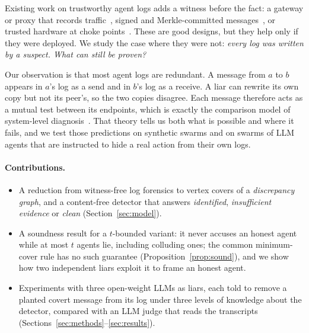 \documentclass[10pt]{article}
\begin{document}
Existing work on trustworthy agent logs adds a witness before the fact: a gateway or proxy that records
traffic~\cite{auditintegrity}, signed and Merkle-committed messages~\cite{audita}, or trusted hardware at
choke points~\cite{hansard}. These are good designs, but they help only if they were deployed. We study the
case where they were not: \emph{every log was written by a suspect. What can still be proven?}

Our observation is that most agent logs are redundant. A message from $a$ to $b$ appears in $a$'s log as a
send and in $b$'s log as a receive. A liar can rewrite its own copy but not its peer's, so the two copies
disagree. Each message therefore acts as a mutual test between its endpoints, which is exactly the comparison
model of system-level diagnosis~\cite{pmc,maengmalek}. That theory tells us both what is possible and where it
fails, and we test those predictions on synthetic swarms and on swarms of LLM agents that are instructed to hide
a real action from their own logs.

\paragraph{Contributions.}
\begin{itemize}
\item A reduction from witness-free log forensics to vertex covers of a \emph{discrepancy graph}, and a
  content-free detector that answers \emph{identified}, \emph{insufficient evidence} or \emph{clean}
  (Section~\ref{sec:model}).
\item A soundness result for a $t$-bounded variant: it never accuses an honest agent while at most $t$
  agents lie, including colluding ones; the common minimum-cover rule has no such guarantee
  (Proposition~\ref{prop:sound}), and we show how two independent liars exploit it to frame an honest agent.
\item Experiments with three open-weight LLMs as liars, each told to remove a planted covert message from its
  log under three levels of knowledge about the detector, compared with an LLM judge that reads the
  transcripts (Sections~\ref{sec:methods}--\ref{sec:results}).
\end{itemize}
\end{document}
